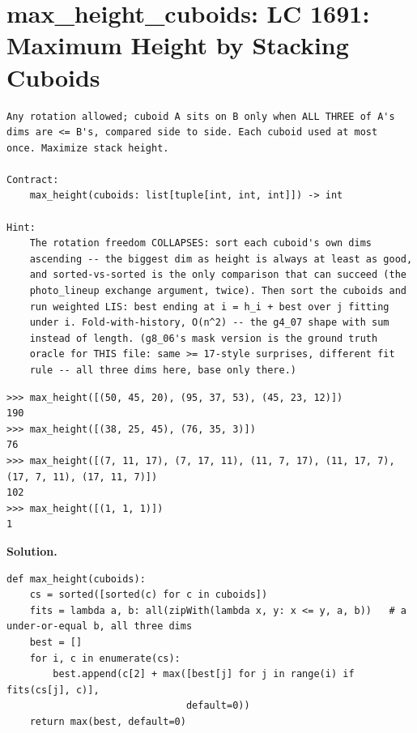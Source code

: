 \documentclass[10pt,letterpaper]{book}
\begin{document}
\section{max\_height\_cuboids: LC 1691: Maximum Height by Stacking Cuboids}
\begin{lstlisting}[style=ex]
Any rotation allowed; cuboid A sits on B only when ALL THREE of A's
dims are <= B's, compared side to side. Each cuboid used at most
once. Maximize stack height.

Contract:
    max_height(cuboids: list[tuple[int, int, int]]) -> int

Hint:
    The rotation freedom COLLAPSES: sort each cuboid's own dims
    ascending -- the biggest dim as height is always at least as good,
    and sorted-vs-sorted is the only comparison that can succeed (the
    photo_lineup exchange argument, twice). Then sort the cuboids and
    run weighted LIS: best ending at i = h_i + best over j fitting
    under i. Fold-with-history, O(n^2) -- the g4_07 shape with sum
    instead of length. (g8_06's mask version is the ground truth
    oracle for THIS file: same >= 17-style surprises, different fit
    rule -- all three dims here, base only there.)
\end{lstlisting}
\begin{lstlisting}[style=ex]
>>> max_height([(50, 45, 20), (95, 37, 53), (45, 23, 12)])
190
>>> max_height([(38, 25, 45), (76, 35, 3)])
76
>>> max_height([(7, 11, 17), (7, 17, 11), (11, 7, 17), (11, 17, 7), (17, 7, 11), (17, 11, 7)])
102
>>> max_height([(1, 1, 1)])
1
\end{lstlisting}
\noindent\textbf{Solution.}
\begin{lstlisting}[style=code]
def max_height(cuboids):
    cs = sorted([sorted(c) for c in cuboids])
    fits = lambda a, b: all(zipWith(lambda x, y: x <= y, a, b))   # a under-or-equal b, all three dims
    best = []
    for i, c in enumerate(cs):
        best.append(c[2] + max([best[j] for j in range(i) if fits(cs[j], c)],
                               default=0))
    return max(best, default=0)
\end{lstlisting}
\end{document}
